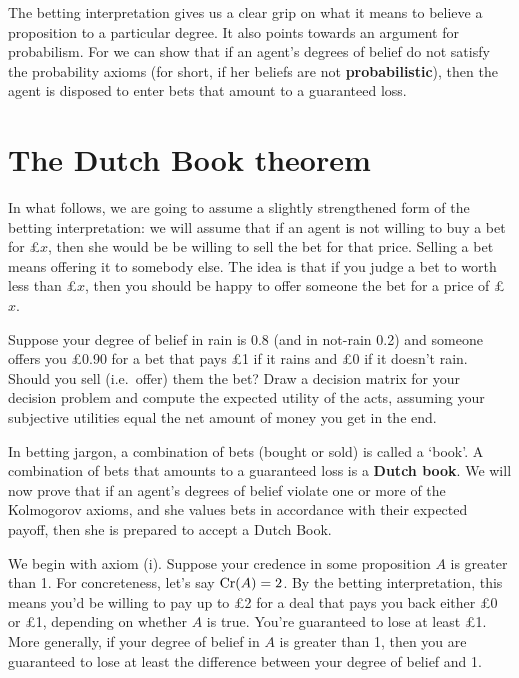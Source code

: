 The betting interpretation gives us a clear grip on what it means to
believe a proposition to a particular degree. It also points towards
an argument for probabilism. For we can show that if an agent's
degrees of belief do not satisfy the probability axioms (for short, if
her beliefs are not \textbf{probabilistic}), then the agent is
disposed to enter bets that amount to a guaranteed loss.

\section{The Dutch Book theorem}

In what follows, we are going to assume a slightly strengthened form of the
betting interpretation: we will assume that if an agent is not willing to buy a
bet for £$x$, then she would be be willing to sell the bet for that
price. Selling a bet means offering it to somebody else. The idea is that if you
judge a bet to worth less than £$x$, then you should be happy to offer someone
the bet for a price of £$x$.

\begin{exercise1}
  Suppose your degree of belief in rain is $0.8$ (and in not-rain 0.2)
  and someone offers you £0.90 for a bet that pays £1 if it rains and
  £0 if it doesn't rain. Should you sell (i.e.\ offer) them the bet?
  Draw a decision matrix for your decision problem and compute the
  expected utility of the acts, assuming your subjective utilities
  equal the net amount of money you get in the end.
\end{exercise1}

In betting jargon, a combination of bets (bought or sold) is called a
`book'. A combination of bets that amounts to a guaranteed loss is a
\textbf{Dutch book}. We will now prove that if an agent's degrees of
belief violate one or more of the Kolmogorov axioms, and she values
bets in accordance with their expected payoff, then she is prepared to
accept a Dutch Book.

We begin with axiom (i). Suppose your credence in some proposition $A$
is greater than 1. For concreteness, let's say $\text{Cr}(A)=2$. By the
betting interpretation, this means you'd be willing to pay up to £2
for a deal that pays you back either £0 or £1, depending on whether
$A$ is true. You're guaranteed to lose at least £1. More generally, if
your degree of belief in $A$ is greater than 1, then you are
guaranteed to lose at least the difference between your degree of
belief and 1.

